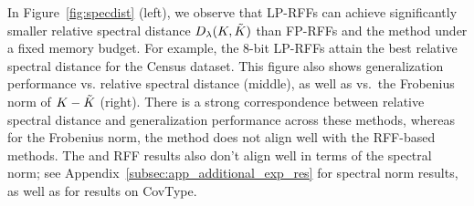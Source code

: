 In Figure~\ref{fig:specdist} (left), we observe that LP-RFFs can achieve significantly smaller relative spectral distance $D_{\lambda}(K,\tilde{K})$ than FP-RFFs and the \Nystrom method under a fixed memory budget. For example, the 8-bit LP-RFFs attain the best relative spectral distance for the Census dataset. This figure also shows generalization performance vs. relative spectral distance (middle), as well as vs.\ the Frobenius norm of $K-\tilde{K}$ (right). There is a strong correspondence between relative spectral distance and generalization performance across these methods, whereas for the Frobenius norm, the \Nystrom method does not align well with the RFF-based methods. The \Nystrom and RFF results also don't align well in terms of the spectral norm; see Appendix~\ref{subsec:app_additional_exp_res} for spectral norm results, as well as for results on CovType.

